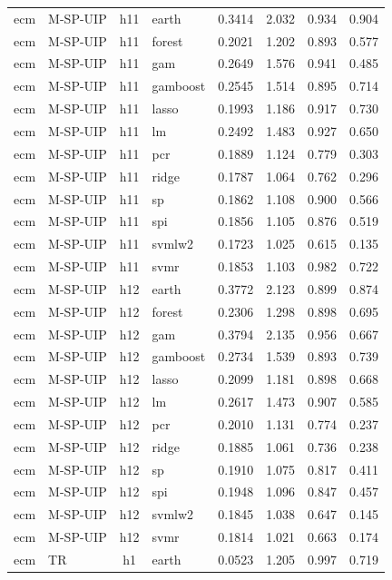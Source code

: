 \begin{ThreePartTable}
\begin{longtable}[t]{llclcccc}
ecm & M-SP-UIP & h11 & earth & 0.3414 & 2.032 & 0.934 & 0.904\\
ecm & M-SP-UIP & h11 & forest & 0.2021 & 1.202 & 0.893 & 0.577\\
ecm & M-SP-UIP & h11 & gam & 0.2649 & 1.576 & 0.941 & 0.485\\
ecm & M-SP-UIP & h11 & gamboost & 0.2545 & 1.514 & 0.895 & 0.714\\
ecm & M-SP-UIP & h11 & lasso & 0.1993 & 1.186 & 0.917 & 0.730\\
ecm & M-SP-UIP & h11 & lm & 0.2492 & 1.483 & 0.927 & 0.650\\
ecm & M-SP-UIP & h11 & pcr & 0.1889 & 1.124 & 0.779 & 0.303\\
ecm & M-SP-UIP & h11 & ridge & 0.1787 & 1.064 & 0.762 & 0.296\\
ecm & M-SP-UIP & h11 & sp & 0.1862 & 1.108 & 0.900 & 0.566\\
ecm & M-SP-UIP & h11 & spi & 0.1856 & 1.105 & 0.876 & 0.519\\
ecm & M-SP-UIP & h11 & svmlw2 & 0.1723 & 1.025 & 0.615 & 0.135\\
ecm & M-SP-UIP & h11 & svmr & 0.1853 & 1.103 & 0.982 & 0.722\\
\addlinespace
ecm & M-SP-UIP & h12 & earth & 0.3772 & 2.123 & 0.899 & 0.874\\
ecm & M-SP-UIP & h12 & forest & 0.2306 & 1.298 & 0.898 & 0.695\\
ecm & M-SP-UIP & h12 & gam & 0.3794 & 2.135 & 0.956 & 0.667\\
ecm & M-SP-UIP & h12 & gamboost & 0.2734 & 1.539 & 0.893 & 0.739\\
ecm & M-SP-UIP & h12 & lasso & 0.2099 & 1.181 & 0.898 & 0.668\\
ecm & M-SP-UIP & h12 & lm & 0.2617 & 1.473 & 0.907 & 0.585\\
ecm & M-SP-UIP & h12 & pcr & 0.2010 & 1.131 & 0.774 & 0.237\\
ecm & M-SP-UIP & h12 & ridge & 0.1885 & 1.061 & 0.736 & 0.238\\
ecm & M-SP-UIP & h12 & sp & 0.1910 & 1.075 & 0.817 & 0.411\\
ecm & M-SP-UIP & h12 & spi & 0.1948 & 1.096 & 0.847 & 0.457\\
ecm & M-SP-UIP & h12 & svmlw2 & 0.1845 & 1.038 & 0.647 & 0.145\\
ecm & M-SP-UIP & h12 & svmr & 0.1814 & 1.021 & 0.663 & 0.174\\
\addlinespace
ecm & TR & h1 & earth & 0.0523 & 1.205 & 0.997 & 0.719\\

\end{longtable}
\end{ThreePartTable}
